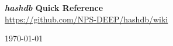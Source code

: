 \documentclass[12pt]{article}
\newcommand{\hdb}{\emph{hashdb}\xspace}
\begin{document}
\begin{center}
\textbf{\Large \hdb Quick Reference} \\
\url{https://github.com/NPS-DEEP/hashdb/wiki}
\end{center}



\begin{center}
\begin{footnotesize}
\today
\end{footnotesize}
\end{center}
\end{document}
